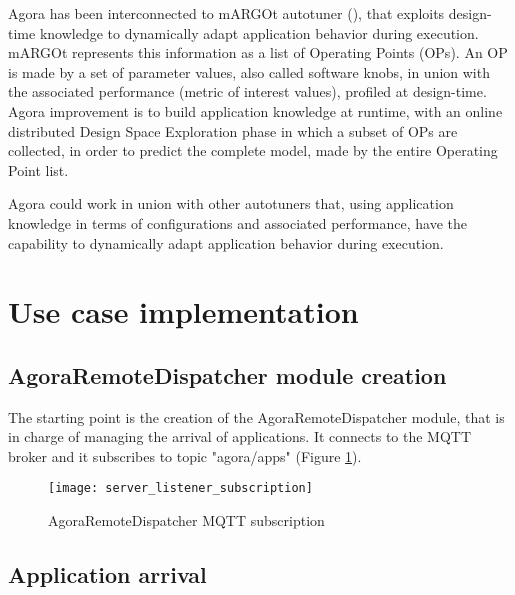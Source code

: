 Agora has been interconnected to mARGOt autotuner (\cite{gadioli2015application}), that exploits design-time knowledge to dynamically adapt application behavior during execution. mARGOt represents this information as a list of Operating Points (OPs). An OP is made by a set of parameter values, also called software knobs, in union with the associated performance (metric of interest values), profiled at design-time. Agora improvement is to build application knowledge at runtime, with an online distributed Design Space Exploration phase in which a subset of OPs are collected, in order to predict the complete model, made by the entire Operating Point list.

Agora could work in union with other autotuners that, using application knowledge in terms of configurations and associated performance, have the capability to dynamically adapt application behavior during execution.










\section{Use case implementation}





\subsection{AgoraRemoteDispatcher module creation}

The starting point is the creation of the AgoraRemoteDispatcher module, that is in charge of managing the arrival of applications. It connects to the MQTT broker and it subscribes to topic "agora/apps" (Figure \ref{fig::dispSub}).

\begin{figure}[ht]

    \centering
    \texttt{[image: server\_listener\_subscription]}
    \caption{AgoraRemoteDispatcher MQTT subscription}

    \label{fig::dispSub}
    
\end{figure}





\subsection{Application arrival}

